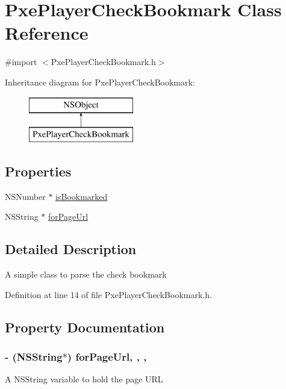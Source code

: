 \hypertarget{interface_pxe_player_check_bookmark}{\section{Pxe\-Player\-Check\-Bookmark Class Reference}
\label{interface_pxe_player_check_bookmark}
}


{\ttfamily \#import $<$Pxe\-Player\-Check\-Bookmark.\-h$>$}

Inheritance diagram for Pxe\-Player\-Check\-Bookmark\-:\begin{figure}[H]
\begin{center}
\leavevmode
\includegraphics[height=2.000000cm]{interface_pxe_player_check_bookmark}
\end{center}
\end{figure}
\subsection*{Properties}
\begin{DoxyCompactItemize}
\item 
N\-S\-Number $\ast$ \hyperlink{interface_pxe_player_check_bookmark_ade2afff8924a07e7d9cc94208f19cc50}{is\-Bookmarked}
\item 
N\-S\-String $\ast$ \hyperlink{interface_pxe_player_check_bookmark_aca2ac182b0cb487c732f6d71d2f5c5a5}{for\-Page\-Url}
\end{DoxyCompactItemize}


\subsection{Detailed Description}
A simple class to parse the check bookmark 

Definition at line 14 of file Pxe\-Player\-Check\-Bookmark.\-h.



\subsection{Property Documentation}
\hypertarget{interface_pxe_player_check_bookmark_aca2ac182b0cb487c732f6d71d2f5c5a5}{
\subsubsection[{for\-Page\-Url}]{\setlength{\rightskip}{0pt plus 5cm}-\/ (N\-S\-String$\ast$) for\-Page\-Url\hspace{0.3cm}{\ttfamily [read]}, {\ttfamily [write]}, {\ttfamily [nonatomic]}, {\ttfamily [strong]}}}\label{interface_pxe_player_check_bookmark_aca2ac182b0cb487c732f6d71d2f5c5a5}
A N\-S\-String variable to hold the page U\-R\-L 

